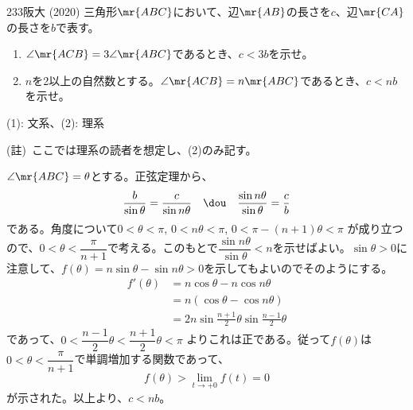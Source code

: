 \begin{prob}{233}{}{阪大 (2020)}
 三角形$\mr{ABC}$において、辺$\mr{AB}$の長さを$c$、辺$\mr{CA}$の長さを$b$で表す。
 \begin{enumerate}
  \item $\angle\mr{ACB}=3\angle\mr{ABC}$であるとき、$c<3b$を示せ。
  \item $n$を2以上の自然数とする。$\angle\mr{ACB}=n\mr{ABC}$であるとき、$c<nb$を示せ。
 \end{enumerate}
 \begin{flushright}
  {\small (1): 文系、(2): 理系}
 \end{flushright}
\end{prob}
(註)~ここでは理系の読者を想定し、(2)のみ記す。

$\angle\mr{ABC}=\theta$とする。正弦定理から、
\[ \frac{b}{\sin\theta}=\frac{c}{\sin n\theta} \quad\dou\quad \frac{\sin n\theta}{\sin\theta}=\frac{c}{b} \]
である。角度について$0<\theta<\pi$, $0<n\theta<\pi$, $0<\pi-(n+1)\theta<\pi$ が成り立つので、$0<\theta<\dfrac{\pi}{n+1}$で考える。このもとで$\dfrac{\sin n\theta}{\sin\theta}<n$を示せばよい。$\sin\theta>0$に注意して、$f(\theta)=n\sin\theta-\sin n\theta>0$を示してもよいのでそのようにする。
\begin{align*}
 f'(\theta)&=n\cos\theta-n\cos n\theta \\
 &=n(\cos\theta-\cos n\theta) \\
 &=2n\sin\frac{n+1}{2}\theta\sin\frac{n-1}{2}\theta
\end{align*}
であって、$0<\dfrac{n-1}{2}\theta<\dfrac{n+1}{2}\theta<\pi$ よりこれは正である。従って$f(\theta)$は$0<\theta<\dfrac{\pi}{n+1}$で単調増加する関数であって、
\[ f(\theta)>\lim_{t\to+0}f(t)=0 \]
が示された。以上より、$c<nb$。